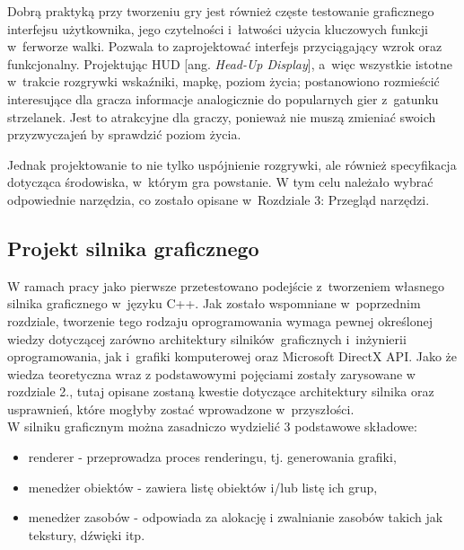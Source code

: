 Dobrą praktyką przy tworzeniu gry jest również częste testowanie graficznego interfejsu użytkownika, jego czytelności i~łatwości użycia kluczowych funkcji w~ferworze walki. Pozwala to zaprojektować interfejs przyciągający wzrok oraz funkcjonalny. Projektując HUD [ang. \emph{Head-Up Display}], a~więc wszystkie istotne w~trakcie rozgrywki wskaźniki, mapkę, poziom życia; postanowiono rozmieścić interesujące dla gracza informacje analogicznie do popularnych gier z~gatunku strzelanek. Jest to atrakcyjne dla graczy, ponieważ nie muszą zmieniać swoich przyzwyczajeń by sprawdzić poziom życia. 

Jednak projektowanie to nie tylko uspójnienie rozgrywki, ale również specyfikacja dotycząca środowiska, w~którym gra powstanie. W tym celu należało wybrać odpowiednie narzędzia, co zostało opisane w~Rozdziale 3: Przegląd narzędzi. 

\subsection{Projekt silnika graficznego}

W ramach pracy jako pierwsze przetestowano podejście z~tworzeniem własnego silnika graficznego w~języku C++. Jak zostało wspomniane w~poprzednim rozdziale, tworzenie tego rodzaju oprogramowania wymaga pewnej określonej wiedzy dotyczącej zarówno architektury silników~graficznych i~inżynierii oprogramowania, jak i~grafiki komputerowej oraz Microsoft DirectX API. Jako że wiedza teoretyczna wraz z podstawowymi pojęciami zostały zarysowane w rozdziale 2., tutaj opisane zostaną kwestie dotyczące architektury silnika oraz usprawnień, które mogłyby zostać wprowadzone w~przyszłości.\\

W silniku graficznym można zasadniczo wydzielić 3 podstawowe składowe:
\begin{itemize}
\item renderer - przeprowadza proces renderingu, tj. generowania grafiki,
\item menedżer obiektów - zawiera listę obiektów i/lub listę ich grup,
\item menedżer zasobów - odpowiada za alokację i zwalnianie zasobów takich jak tekstury, dźwięki itp.
\end{itemize}

